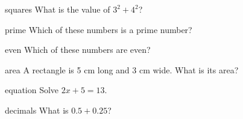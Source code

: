 \begin{question}{squares}
  What is the value of $3^2 + 4^2$?
  \begin{choices}
  \end{choices}
\end{question}

\begin{question}{prime}
  Which of these numbers is a prime number?
  \begin{choices}
  \end{choices}
\end{question}

\begin{questionmult}{even}
  Which of these numbers are even?
  \begin{choices}
  \end{choices}
\end{questionmult}

\begin{question}{area}
  A rectangle is 5 cm long and 3 cm wide. What is its area?
  \begin{choices}
  \end{choices}
\end{question}

\begin{question}{equation}
  Solve $2x + 5 = 13$.
  \begin{choices}
  \end{choices}
\end{question}

\begin{question}{decimals}
  What is $0.5 + 0.25$?
  \begin{choices}
  \end{choices}
\end{question}

